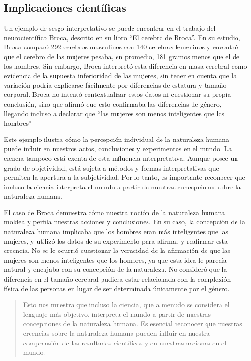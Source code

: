 \documentclass[
  jou,
  floatsintext,
  longtable,
  a4paper,
  nolmodern,
  notxfonts,
  notimes,
  12pt,
  colorlinks=true,linkcolor=blue,citecolor=blue,urlcolor=blue]{apa7}
\begin{document}
\subsection{Implicaciones
científicas}\label{implicaciones-cientuxedficas}

Un ejemplo de sesgo interpretativo se puede encontrar en el trabajo del
neurocientífico Broca, descrito en su libro ``El cerebro de Broca''. En
su estudio, Broca comparó 292 cerebros masculinos con 140 cerebros
femeninos y encontró que el cerebro de las mujeres pesaba, en promedio,
181 gramos menos que el de los hombres. Sin embargo, Broca interpretó
esta diferencia en masa cerebral como evidencia de la supuesta
inferioridad de las mujeres, sin tener en cuenta que la variación podría
explicarse fácilmente por diferencias de estatura y tamaño corporal.
Broca no intentó contextualizar estos datos ni cuestionar su propia
conclusión, sino que afirmó que esto confirmaba las diferencias de
género, llegando incluso a declarar que ``las mujeres son menos
inteligentes que los hombres''

Este ejemplo ilustra cómo la percepción individual de la naturaleza
humana puede influir en nuestros actos, conclusiones y experimentos en
el mundo. La ciencia tampoco está exenta de esta influencia
interpretativa. Aunque posee un grado de objetividad, está sujeta a
métodos y formas interpretativas que permiten la apertura a la
subjetividad. Por lo tanto, es importante reconocer que incluso la
ciencia interpreta el mundo a partir de nuestras concepciones sobre la
naturaleza humana.

El caso de Broca demuestra cómo nuestra noción de la naturaleza humana
moldea y perfila nuestras acciones y conclusiones. En su caso, la
concepción de la naturaleza humana implicaba que los hombres eran más
inteligentes que las mujeres, y utilizó los datos de su experimento para
afirmar y reafirmar esta creencia. No se le ocurrió cuestionar la
veracidad de la afirmación de que las mujeres son menos inteligentes que
los hombres, ya que esta idea le parecía natural y encajaba con su
concepción de la naturaleza. No consideró que la diferencia en el tamaño
cerebral pudiera estar relacionada con la complexión física de las
personas en lugar de ser determinada únicamente por el género.

\begin{quote}
Esto nos muestra que incluso la ciencia, que a menudo se considera el
lenguaje más objetivo, interpreta el mundo a partir de nuestras
concepciones de la naturaleza humana. Es esencial reconocer que nuestras
creencias sobre la naturaleza humana pueden influir en nuestra
comprensión de los resultados científicos y en nuestras acciones en el
mundo.
\end{quote}
\end{document}
